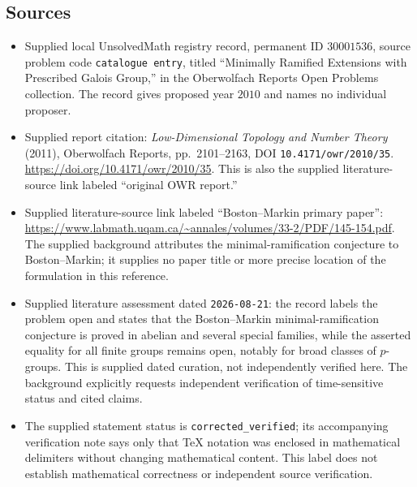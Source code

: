 \documentclass[11pt]{article}
\begin{document}
\subsection{Sources}
\begin{itemize}
\item Supplied local UnsolvedMath registry record, permanent ID \(30001536\), source problem code \texttt{catalogue entry}, titled ``Minimally Ramified Extensions with Prescribed Galois Group,'' in the Oberwolfach Reports Open Problems collection. The record gives proposed year \(2010\) and names no individual proposer.
\item Supplied report citation: \emph{Low-Dimensional Topology and Number Theory} (2011), Oberwolfach Reports, pp.\ 2101--2163, DOI \texttt{10.4171/owr/2010/35}. \url{https://doi.org/10.4171/owr/2010/35}. This is also the supplied literature-source link labeled ``original OWR report.''
\item Supplied literature-source link labeled ``Boston--Markin primary paper'': \url{https://www.labmath.uqam.ca/~annales/volumes/33-2/PDF/145-154.pdf}. The supplied background attributes the minimal-ramification conjecture to Boston--Markin; it supplies no paper title or more precise location of the formulation in this reference.
\item Supplied literature assessment dated \texttt{2026-08-21}: the record labels the problem open and states that the Boston--Markin minimal-ramification conjecture is proved in abelian and several special families, while the asserted equality for all finite groups remains open, notably for broad classes of \(p\)-groups. This is supplied dated curation, not independently verified here. The background explicitly requests independent verification of time-sensitive status and cited claims.
\item The supplied statement status is \texttt{corrected\_verified}; its accompanying verification note says only that TeX notation was enclosed in mathematical delimiters without changing mathematical content. This label does not establish mathematical correctness or independent source verification.
\end{itemize}
\end{document}
